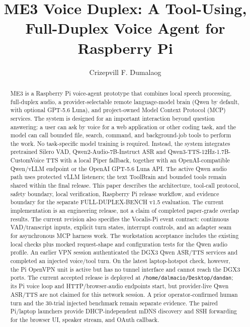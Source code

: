 \documentclass[sigconf,nonacm,balance=false]{acmart}
\title{ME3 Voice Duplex: A Tool-Using, Full-Duplex Voice Agent for Raspberry Pi}
\author{Crizepvill F. Dumalaog}
\affiliation{\institution{Mapua University}\department{Master of Engineering in Artificial Intelligence}\city{Manila}\country{Philippines}}
\begin{document}
\begin{abstract}
ME3 is a Raspberry Pi voice-agent prototype that combines local speech processing,
full-duplex audio, a provider-selectable remote language-model brain (Qwen by
default, with optional GPT-5.6 Luna), and project-owned Model
Context Protocol (MCP) services. The system is designed for an important
interaction beyond question answering: a user can ask by voice for a web
application or other coding task, and the model can call bounded file, search,
command, and background-job tools to perform the work. No task-specific model
training is required. Instead, the system integrates pretrained Silero VAD,
Qwen2-Audio-7B-Instruct ASR and Qwen3-TTS-12Hz-1.7B-CustomVoice TTS with a
local Piper fallback, together with an OpenAI-compatible
Qwen/vLLM endpoint or the OpenAI GPT-5.6 Luna API. The active Qwen audio path
uses protected vLLM listeners; the text ToolBrain and bounded tools remain
shared within the final release.
This paper describes the architecture, tool-call protocol, safety boundary,
local verification, Raspberry Pi release workflow, and evidence boundary for
the separate FULL-DUPLEX-BENCH v1.5 evaluation. The current implementation is
an engineering release, not a claim of completed paper-grade overlap results.
The current revision also specifies the Vocalis-Pi event contract: continuous
VAD/transcript inputs, explicit turn states, interrupt controls, and an
adapter seam for asynchronous MCP harness work. The workstation acceptance
includes the existing local checks plus mocked request-shape and configuration
tests for the Qwen audio profile. An earlier VPN session authenticated the
DGX3 Qwen ASR/TTS services and completed an injected voice/tool turn. On the
latest laptop-hotspot check, however, the Pi OpenVPN unit is active but has no
tunnel interface and cannot reach the DGX3 ports. The current accepted release
is deployed at \texttt{/home/dalmacio/Desktop/dandan}; its Pi voice loop and
HTTP/browser-audio endpoints start, but provider-live Qwen ASR/TTS are not
claimed for this network session. A prior operator-confirmed human turn and the
30-trial injected benchmark remain separate evidence. The paired Pi/laptop
launchers provide DHCP-independent mDNS discovery and SSH forwarding for the
browser UI, speaker stream, and OAuth callback.
\end{abstract}


\maketitle
\end{document}
